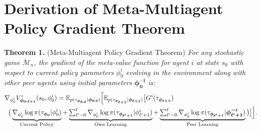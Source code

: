 \onecolumn
\section{Derivation of Meta-Multiagent Policy Gradient Theorem}\label{sec:proof-meta-multiagent-pg}
\textbf{Theorem 1.} (Meta-Multiagent Policy Gradient Theorem) \textit{For any stochastic game $\mathcal{M}_{n}$, the gradient of the meta-value function for agent $i$ at state $s_0$ with respect to current policy parameters $\phi_0^i$ evolving in the environment along with other peer agents using initial parameters $\bm{\phi}_{\bm{0}}^{\bm{-i}}$ is:}
\begin{align*}
\begin{split}
&\nabla_{\phi^{i}_{0}}V^{i}_{\bm{\phi}_{\bm{0:\ell+1}}}(s_0,\phi^{i}_{0})=\mathbb{E}_{p(\tau_{\bm{\phi}_{\bm{0:\ell}}}|\bm{\phi}_{\bm{0:\ell}})}\Big[\mathbb{E}_{p(\tau_{\bm{\phi}_{\bm{\ell+1}}}|\bm{\phi}_{\bm{\ell+1}})}\big[G^{i}(\tau_{\bm{\phi}_{\bm{\ell+1}}})\\
&\;\;\big(\underbrace{\nabla_{\phi^{i}_{0}}\log\pi(\tau_{\bm{\phi}_{\bm{0}}}|\phi^{i}_{0})}_{\text{Current Policy}}+\underbrace{\textstyle\sum\limits\nolimits_{\ell'=0}^{\ell}\nabla_{\phi^{i}_{0}}\log\pi(\tau_{\bm{\phi}_{\bm{\ell'+1}}}|\phi^{i}_{\ell'+1})}_{\text{Own Learning}}+\underbrace{\textstyle\sum\limits\nolimits_{\ell'=0}^{\ell}\nabla_{\phi^{i}_{0}}\log\pi(\tau_{\bm{\phi}_{\bm{\ell'+1}}}|\bm{\phi}^{\bm{-i}}_{\bm{\ell'+1}})}_{\text{Peer Learning}}\big)\big]\Big].
\end{split}
\end{align*}
